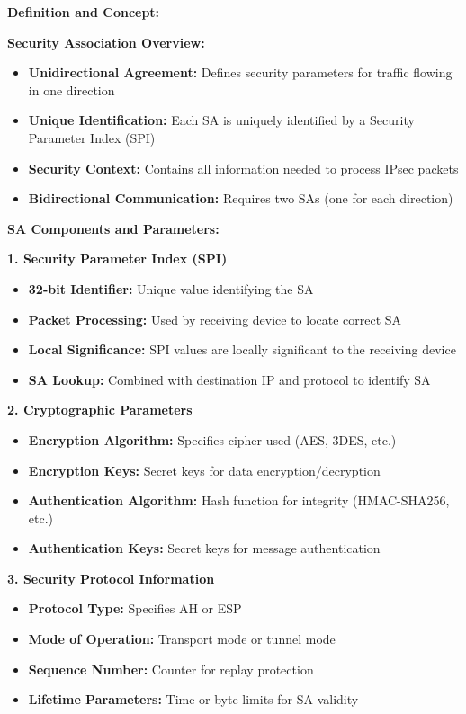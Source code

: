 \documentclass[12pt,a4paper]{article}
\begin{document}
\textbf{Definition and Concept:}

\textbf{Security Association Overview:}
\begin{itemize}
    \item \textbf{Unidirectional Agreement:} Defines security parameters for traffic flowing in one direction
    \item \textbf{Unique Identification:} Each SA is uniquely identified by a Security Parameter Index (SPI)
    \item \textbf{Security Context:} Contains all information needed to process IPsec packets
    \item \textbf{Bidirectional Communication:} Requires two SAs (one for each direction)
\end{itemize}

\textbf{SA Components and Parameters:}

\textbf{1. Security Parameter Index (SPI)}
\begin{itemize}
    \item \textbf{32-bit Identifier:} Unique value identifying the SA
    \item \textbf{Packet Processing:} Used by receiving device to locate correct SA
    \item \textbf{Local Significance:} SPI values are locally significant to the receiving device
    \item \textbf{SA Lookup:} Combined with destination IP and protocol to identify SA
\end{itemize}

\textbf{2. Cryptographic Parameters}
\begin{itemize}
    \item \textbf{Encryption Algorithm:} Specifies cipher used (AES, 3DES, etc.)
    \item \textbf{Encryption Keys:} Secret keys for data encryption/decryption
    \item \textbf{Authentication Algorithm:} Hash function for integrity (HMAC-SHA256, etc.)
    \item \textbf{Authentication Keys:} Secret keys for message authentication
\end{itemize}

\textbf{3. Security Protocol Information}
\begin{itemize}
    \item \textbf{Protocol Type:} Specifies AH or ESP
    \item \textbf{Mode of Operation:} Transport mode or tunnel mode
    \item \textbf{Sequence Number:} Counter for replay protection
    \item \textbf{Lifetime Parameters:} Time or byte limits for SA validity
\end{itemize}
\end{document}
